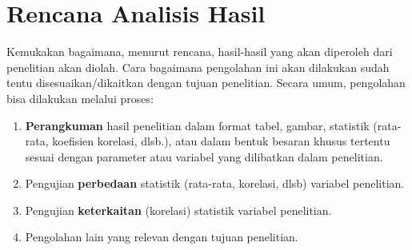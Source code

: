 \section{Rencana Analisis Hasil}
Kemukakan bagaimana, menurut rencana, hasil-hasil yang akan
diperoleh dari penelitian akan diolah. Cara bagaimana pengolahan ini akan dilakukan
sudah tentu disesuaikan/dikaitkan dengan tujuan penelitian. Secara umum, pengolahan bisa
dilakukan melalui proses:
\begin{enumerate}[label=\alph*)]
\item \textbf{Perangkuman} hasil penelitian dalam format tabel, gambar, statistik (rata-rata,
koefisien korelasi, dlsb.), atau dalam bentuk besaran khusus tertentu sesuai dengan
parameter atau variabel yang dilibatkan dalam penelitian.
\item Pengujian \textbf{perbedaan} statistik (rata-rata, korelasi, dlsb) variabel penelitian.
\item Pengujian \textbf{keterkaitan} (korelasi) statistik variabel penelitian.
\item Pengolahan lain yang relevan dengan tujuan penelitian.
\end{enumerate}